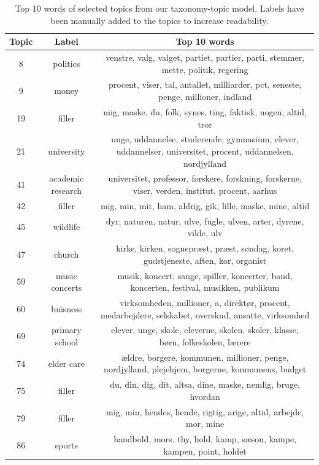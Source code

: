 \begin{table}[h]
	\centering
	\caption{Top 10 words of selected topics from our taxonomy-topic model. Labels have been manually added to the topics to increase readability.}
	\label{tab:pachinko_selected_topics}
	\begin{tabular}{c | c | c}
		Topic & Label & Top 10 words \\
		\hline
		8 & politics & venstre, valg, valget, partiet, partier, parti, stemmer, mette, politik, regering \\
		9 & money & procent, viser, tal, antallet, milliarder, pct, seneste, penge, millioner, indland \\
		19 & filler & mig, maske, du, folk, synes, ting, faktisk, nogen, altid, tror \\
		21 & university & unge, uddannelse, studerende, gymnasium, elever, uddannelser, universitet, procent, uddannelsen, nordjylland \\
		41 & academic research & universitet, professor, forskere, forskning, forskerne, viser, verden, institut, procent, aarhus \\
		42 & filler & mig, min, mit, ham, aldrig, gik, lille, maske, mine, altid \\
		45 & wildlife & dyr, naturen, natur, ulve, fugle, ulven, arter, dyrene, vilde, ulv \\
		47 & church & kirke, kirken, sognepræst, præst, søndag, koret, gudstjeneste, aften, kor, organist \\
		59 & music concerts & musik, koncert, sange, spiller, koncerter, band, koncerten, festival, musikken, publikum \\
		60 & buisness & virksomheden, millioner, a, direktør, procent, medarbejdere, selskabet, overskud, ansatte, virksomhed \\
		69 & primary school & elever, unge, skole, eleverne, skolen, skoler, klasse, børn, folkeskolen, lærere \\
		74 & elder care & ældre, borgere, kommunen, millioner, penge, nordjylland, plejehjem, borgerne, kommunens, budget \\
		75 & filler & du, din, dig, dit, altsa, dine, maske, nemlig, bruge, hvordan \\
		79 & filler & mig, min, hendes, hende, rigtig, arige, altid, arbejde, mor, mine \\
		86 & sports & handbold, mors, thy, hold, kamp, sæson, kampe, kampen, point, holdet \\
	\end{tabular}
\end{table}


